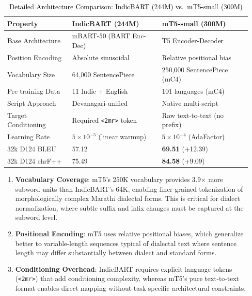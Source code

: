 \begin{table}[t]
\color{black}
\centering
\caption{\textcolor{black}{Detailed Architecture Comparison: IndicBART (244M) vs.\ mT5-small (300M)}}
\label{tab:arch_compare}
\begin{tabularx}{\textwidth}{lXX}
\hline
\textbf{Property} & \textbf{IndicBART (244M)} & \textbf{mT5-small (300M)} \\
\hline
Base Architecture & mBART-50 (BART Enc-Dec) & T5 Encoder-Decoder \\
Position Encoding & Absolute sinusoidal & Relative positional bias \\
Vocabulary Size & 64,000 SentencePiece & 250,000 SentencePiece (mC4) \\
Pre-training Data & 11 Indic + English & 101 languages (mC4) \\
Script Approach & Devanagari-unified & Native multi-script \\
Target Conditioning & Required \texttt{<2mr>} token & Raw text-to-text (no prefix) \\
Learning Rate & $5 \times 10^{-5}$ (linear warmup) & $5 \times 10^{-4}$ (AdaFactor) \\
32k D124 BLEU & 57.12 & \textbf{69.51} (+12.39) \\
32k D124 chrF++ & 75.49 & \textbf{84.58} (+9.09) \\
\hline
\end{tabularx}
\end{table}

\begin{enumerate}
    \item \textbf{Vocabulary Coverage}: mT5's 250K vocabulary provides 3.9$\times$ more subword units than IndicBART's 64K, enabling finer-grained tokenization of morphologically complex Marathi dialectal forms. This is critical for dialect normalization, where subtle suffix and infix changes must be captured at the subword level.
    \item \textbf{Positional Encoding}: mT5 uses relative positional biases, which generalize better to variable-length sequences typical of dialectal text where sentence length may differ substantially between dialect and standard forms.
    \item \textbf{Conditioning Overhead}: IndicBART requires explicit language tokens (\texttt{<2mr>}) that add conditioning complexity, whereas mT5's pure text-to-text format enables direct mapping without task-specific architectural constraints.
\end{enumerate}


